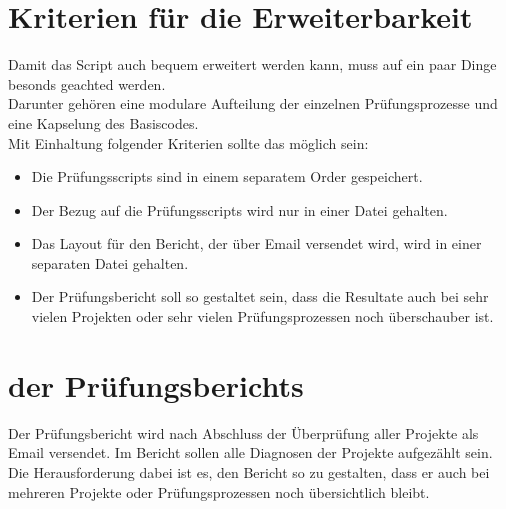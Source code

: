 \section{Kriterien für die Erweiterbarkeit}
Damit das Script auch bequem erweitert werden kann, muss auf ein paar Dinge besonds geachted werden. \\
Darunter gehören eine modulare Aufteilung der einzelnen Prüfungsprozesse und eine Kapselung des Basiscodes. \\
Mit Einhaltung folgender Kriterien sollte das möglich sein:
\begin{itemize}
    \item Die Prüfungsscripts sind in einem separatem Order gespeichert.
    \item Der Bezug auf die Prüfungsscripts wird nur in einer Datei gehalten. 
    \item Das Layout für den Bericht, der über Email versendet wird, wird in einer separaten Datei gehalten.
    \item Der Prüfungsbericht soll so gestaltet sein, dass die Resultate auch bei sehr vielen Projekten oder sehr vielen Prüfungsprozessen noch überschauber ist.
\end{itemize}

\clearpage
\section{der Prüfungsberichts}
Der Prüfungsbericht wird nach Abschluss der Überprüfung aller Projekte als Email versendet. Im Bericht sollen alle Diagnosen der Projekte aufgezählt sein.
Die Herausforderung dabei ist es, den Bericht so zu gestalten, dass er auch bei mehreren Projekte oder Prüfungsprozessen noch übersichtlich bleibt. 


